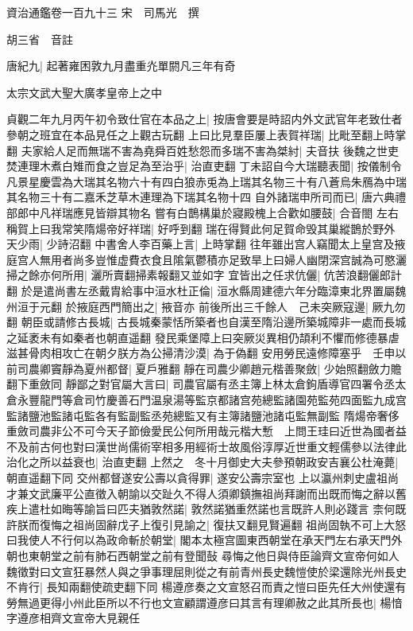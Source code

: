 資治通鑑卷一百九十三
宋　司馬光　撰

胡三省　音註

唐紀九|{
	起著雍困敦九月盡重灮單閼凡三年有奇}


太宗文武大聖大廣孝皇帝上之中

貞觀二年九月丙午初令致仕官在本品之上|{
	按唐會要是時詔内外文武官年老致仕者參朝之班宜在本品見任之上觀古玩翻}
上曰比見羣臣屢上表賀祥瑞|{
	比毗至翻上時掌翻}
夫家給人足而無瑞不害為堯舜百姓愁怨而多瑞不害為桀紂|{
	夫音扶}
後魏之世吏焚連理木煮白雉而食之豈足為至治乎|{
	治直吏翻}
丁未詔自今大瑞聽表聞|{
	按儀制令凡景星慶雲為大瑞其名物六十有四白狼赤兎為上瑞其名物三十有八蒼烏朱鴈為中瑞其名物三十有二嘉禾芝草木連理為下瑞其名物十四}
自外諸瑞申所司而已|{
	唐六典禮部郎中凡祥瑞應見皆辯其物名}
嘗有白鵲構巢於寢殿槐上合歡如腰鼓|{
	合音閤}
左右稱賀上曰我常笑隋煬帝好祥瑞|{
	好呼到翻}
瑞在得賢此何足賀命毁其巢縱鵲於野外　天少雨|{
	少詩沼翻}
中書舍人李百藥上言|{
	上時掌翻}
往年雖出宫人竊聞太上皇宫及掖庭宫人無用者尚多豈惟虚費衣食且隂氣鬱積亦足致旱上曰婦人幽閉深宫誠為可愍灑掃之餘亦何所用|{
	灑所賣翻掃素報翻又並如字}
宜皆出之任求伉儷|{
	伉苦浪翻儷郎計翻}
於是遣尚書左丞戴胄給事中洹水杜正倫|{
	洹水縣周建德六年分臨漳東北界置屬魏州洹于元翻}
於掖庭西門簡出之|{
	掖音亦}
前後所出三千餘人　己未突厥寇邊|{
	厥九勿翻}
朝臣或請修古長城|{
	古長城秦蒙恬所築者也自漢至隋沿邊所築城障非一處而長城之延袤未有如秦者也朝直遥翻}
發民乘堡障上曰突厥災異相仍頡利不懼而修德暴虐滋甚骨肉相攻亡在朝夕朕方為公掃清沙漠|{
	為于偽翻}
安用勞民遠修障塞乎　壬申以前司農卿竇靜為夏州都督|{
	夏戶雅翻}
靜在司農少卿趙元楷善聚斂|{
	少始照翻斂力贍翻下重斂同}
靜鄙之對官屬大言曰|{
	司農官屬有丞主簿上林太倉鉤盾導官四署令丞太倉永豐龍門等倉司竹慶善石門温泉湯等監京都諸宫苑總監諸園苑監苑四面監九成宫監諸鹽池監諸屯監各有監副監丞苑總監又有主簿諸鹽池諸屯監無副監}
隋煬帝奢侈重斂司農非公不可今天子節儉愛民公何所用哉元楷大慙　上問王珪曰近世為國者益不及前古何也對曰漢世尚儒術宰相多用經術士故風俗淳厚近世重文輕儒參以法律此治化之所以益衰也|{
	治直吏翻}
上然之　冬十月御史大夫參預朝政安吉襄公杜淹薨|{
	朝直遥翻下同}
交州都督遂安公壽以貪得罪|{
	遂安公壽宗室也}
上以瀛州刺史盧祖尚才兼文武廉平公直徵入朝諭以交趾久不得人須卿鎮撫祖尚拜謝而出既而悔之辭以舊疾上遣杜如晦等諭旨曰匹夫猶敦然諾|{
	敦然諾猶重然諾也言既許人則必踐言}
柰何既許朕而復悔之祖尚固辭戊子上復引見諭之|{
	復扶又翻見賢遍翻}
祖尚固執不可上大怒曰我使人不行何以為政命斬於朝堂|{
	閣本太極宫圖東西朝堂在承天門左右承天門外朝也東朝堂之前有肺石西朝堂之前有登聞鼔}
尋悔之他日與侍臣論齊文宣帝何如人魏徵對曰文宣狂暴然人與之爭事理屈則從之有前青州長史魏愷使於梁還除光州長史不肯行|{
	長知兩翻使疏吏翻下同}
楊遵彦奏之文宣怒召而責之愷曰臣先任大州使還有勞無過更得小州此臣所以不行也文宣顧謂遵彦曰其言有理卿赦之此其所長也|{
	楊愔字遵彦相齊文宣帝大見親任}
